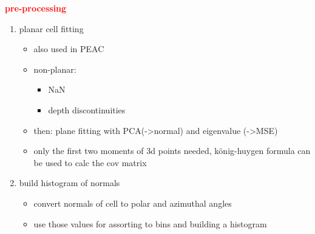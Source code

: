 \documentclass[main.tex]{subfiles}
\begin{document}
\textbf{\textcolor{red}{pre-processing}}
\begin{enumerate}
    \item planar cell fitting
          \begin{itemize}
              \item also used in PEAC
              \item non-planar:
                    \begin{itemize}
                        \item NaN
                        \item depth discontinuities
                    \end{itemize}
              \item then: plane fitting with PCA(->normal) and eigenvalue (->MSE)
              \item only the first two moments of 3d points needed, könig-huygen formula can be used to calc the cov matrix
          \end{itemize}
    \item build histogram of normals
          \begin{itemize}
              \item convert normals of cell to polar and azimuthal angles
              \item use those values for assorting to bins and building a histogram
          \end{itemize}
\end{enumerate}
\end{document}
